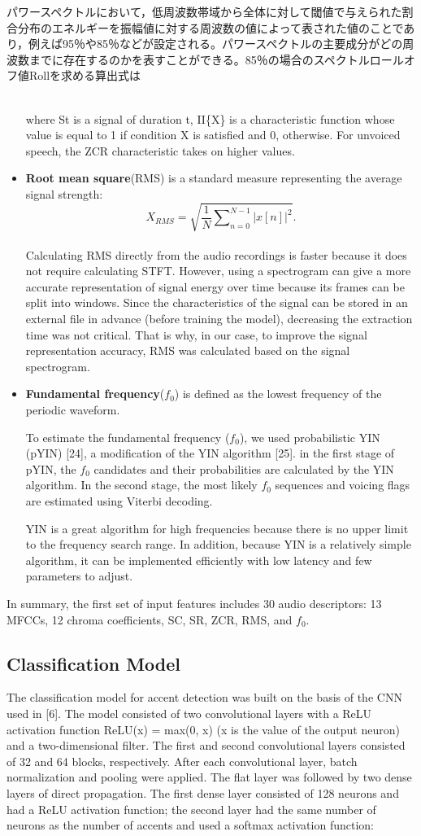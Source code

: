 パワースペクトルにおいて，低周波数帯域から全体に対して閾値で与えられた割合分布のエネルギーを振幅値に対する周波数の値によって表された値のことであり，例えば95％や85％などが設定される。パワースペクトルの主要成分がどの周波数までに存在するのかを表すことができる。85％の場合のスペクトルロールオフ値Rollを求める算出式は\documentclass[ams]{U-AizuGT}
\begin{document}
\begin{itemize}
{\begin{equation}
\end{equation}\\
where St is a signal of duration t, II\{X\} is a characteristic function whose value is equal to 1 if condition X is satisfied and 0, otherwise. For unvoiced speech, the ZCR characteristic takes on higher values.
}
\item {\textbf{Root mean square}(RMS) is a standard measure representing the average signal strength:
\\
\begin{equation}
X_{RMS}=\sqrt{\frac{1}{N}\sum\nolimits_{n=0}^{N-1} |x[n]|^2}.
\end{equation}
\\
Calculating RMS directly from the audio recordings is faster because it does not require calculating STFT. However, using a spectrogram can give a more accurate representation of signal energy over time because its frames can be split into windows. Since the characteristics of the signal can be stored in an external file in advance (before training the model), decreasing the extraction time was not critical. That is why, in our case, to improve the signal representation accuracy, RMS was calculated based on the signal spectrogram.
}

\item {\textbf{Fundamental frequency}($f_0$) is defined as the lowest frequency of the periodic waveform.\par
To estimate the fundamental frequency ($f_0$), we used probabilistic YIN (pYIN) [24], a modification of the YIN algorithm [25]. in the first stage of pYIN, the $f_0$ candidates and their probabilities are calculated by the YIN algorithm. In the second stage, the most likely $f_0$ sequences and voicing flags are estimated using Viterbi decoding.\par
YIN is a great algorithm for high frequencies because there is no upper limit to the frequency search range. In addition, because YIN is a relatively simple algorithm, it can be implemented efficiently with low latency and few parameters to adjust.}
\end{itemize}

In summary, the first set of input features includes 30 audio descriptors: 13 MFCCs, 12 chroma coefficients, SC, SR, ZCR, RMS, and $f_0$.

\subsection{Classification Model}
The classification model for accent detection was built on the basis of the CNN used in [6]. The model consisted of two convolutional layers with a ReLU activation function ReLU(x) = max(0, x) (x is the value of the output neuron) and a two-dimensional filter. The first and second convolutional layers consisted of 32 and 64 blocks, respectively. After each convolutional layer, batch normalization and pooling were applied. The flat layer was followed by two dense layers of direct propagation.
The first dense layer consisted of 128 neurons and had a ReLU activation function; the second layer had the same number of neurons as the number of accents and used a softmax activation function:
\end{document}
